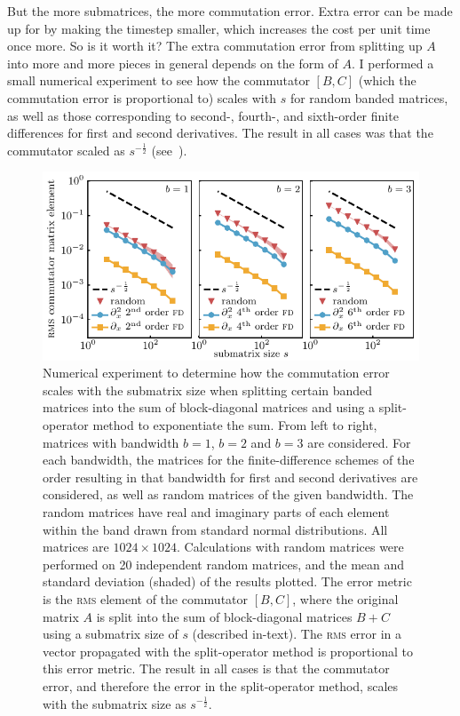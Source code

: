 But the more submatrices, the more commutation error. Extra error can be made up for by making the timestep smaller, which increases the cost per unit time once more. So is it worth it? The extra commutation error from splitting up $A$ into more and more pieces in general depends on the form of $A$. I performed a small numerical experiment to see how the commutator $[B, C]$ (which the commutation error is proportional to) scales with $s$ for random banded matrices, as well as those corresponding to second-, fourth-, and sixth-order finite differences for first and second derivatives. The result in all cases was that the commutator scaled as $s^{-\frac12}$ (see~).

\begin{figure}[t]
    \centerfloat
    \includegraphics[width=\textwidth]{figures/numerics/commutation_error.pdf}
    \caption{Numerical experiment to determine how the commutation error scales with the submatrix size when splitting certain banded matrices into the sum of block-diagonal matrices and using a split-operator method to exponentiate the sum. From left to right, matrices with bandwidth $b=1$, $b=2$ and $b=3$ are considered. For each bandwidth, the matrices for the finite-difference schemes of the order resulting in that bandwidth for first and second derivatives are considered, as well as random matrices of the given bandwidth. The random matrices have real and imaginary parts of each element within the band drawn from standard normal distributions. All matrices are $1024\times1024$. Calculations with random matrices were performed on 20 independent random matrices, and the mean and standard deviation (shaded) of the results plotted. The error metric is the \textsc{rms} element of the commutator $[B, C]$, where the original matrix $A$ is split into the sum of block-diagonal matrices $B + C$ using a submatrix size of $s$ (described in-text). The \textsc{rms} error in a vector propagated with the split-operator method is proportional to this error metric. The result in all cases is that the commutator error, and therefore the error in the split-operator method, scales with the submatrix size as $s^{-\frac12}$.}
    \label{fig:commutation_error}
\end{figure}

